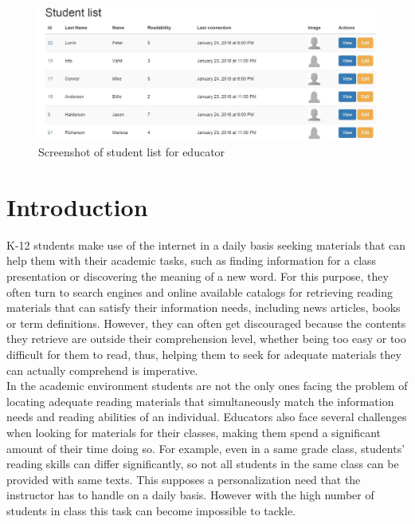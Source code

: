 \documentclass{sig-alternate-05-2015}
\begin{document}
\begin{figure}[ht]
 \centering
  \includegraphics[width=1\textwidth]{StudentList}
 \caption{Screenshot of student list for educator}
  \label{fig:studentList}
 \end{figure}
\section{Introduction}


K-12 students make use of the internet in a daily basis seeking materials that can help them with their academic tasks, such as finding information for a class presentation or discovering the meaning of a new word. For this purpose, they often turn to search engines and online available catalogs for retrieving reading materials that can satisfy their information needs, including news articles, books or term definitions. However, they can often get discouraged because the contents they retrieve are outside their comprehension level, whether being too easy or too difficult  for them to read, thus, helping them to seek for adequate materials they can actually comprehend is imperative.\\



In the academic environment students are not the only ones facing the problem of locating adequate reading materials that simultaneously match the information needs and reading abilities of an individual. Educators also face several challenges when looking for materials for their classes, making them spend a significant amount of their time doing so. For example, even in a same grade class, students' reading skills can differ significantly, so not all students in the same class can be provided with same texts. This supposes a personalization need that the instructor has to handle on a daily basis. However with the high number of students in class this task can become impossible to tackle. \\
\end{document}

